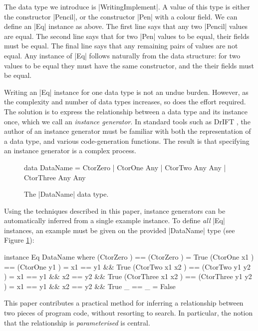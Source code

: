 \documentclass{llncs}
\begin{document}
The data type we introduce is |WritingImplement|. A value of this type is either the constructor |Pencil|, or the constructor |Pen| with a colour field. We can define an |Eq| instance as above. The first line says that any two |Pencil| values are equal. The second line says that for two |Pen| values to be equal, their fields must be equal. The final line says that any remaining pairs of values are not equal. Any instance of |Eq| follows naturally from the data structure: for two values to be equal they must have the same constructor, and the their fields must be equal.

Writing an |Eq| instance for one data type is not an undue burden. However, as the complexity and number of data types increases, so does the effort required. The solution is to express the relationship between a data type and its instance once, which we call an \textit{instance generator}. In standard tools such as DrIFT \cite{drift}, the author of an instance generator must be familiar with both the representation of a data type, and various code-generation functions. The result is that specifying an instance generator is a complex process.

\begin{figure}[tbp]
\begin{code}
data DataName  =  CtorZero
               |  CtorOne    Any
               |  CtorTwo    Any  Any
               |  CtorThree  Any  Any
\end{code}
\caption{The |DataName| data type.}
\label{fig:dataname}
\end{figure}

Using the techniques described in this paper, instance generators can be automatically inferred from a single example instance. To define \textit{all} |Eq| instances, an example must be given on the provided |DataName| type (see Figure \ref{fig:dataname}):

\begin{code}
instance Eq DataName where
    (CtorZero          )  == (CtorZero          )  = True
    (CtorOne    x1     )  == (CtorOne    y1     )  = x1 == y1 && True
    (CtorTwo    x1 x2  )  == (CtorTwo    y1 y2  )  = x1 == y1 && x2 == y2 && True
    (CtorThree  x1 x2  )  == (CtorThree  y1 y2  )  = x1 == y1 && x2 == y2 && True
    _                     == _                     = False
\end{code}

This paper contributes a practical method for inferring a relationship between two pieces of program code, without resorting to search. In particular, the notion that the relationship is \textit{parameterised} is central.
\end{document}

